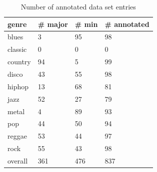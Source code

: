 \documentclass{article}
\begin{document}
\begin{table}
    \begin{center}
        \begin{tabular}{|l|l|l|l|}
        \hline
        genre & \# major & \# min & \# annotated \\
        \hline
        blues 	&3 	    &95     &98\\
        \hline
        classic &0 	    &0 	    &0\\
        \hline
        country &94 	&5 	    &99\\
        \hline
        disco 	&43 	&55 	&98\\
        \hline
        hiphop 	&13 	&68 	&81\\
        \hline
        jazz 	&52 	&27 	&79\\
        \hline
        metal 	&4 	    &89 	&93\\
        \hline
        pop 	&44 	&50 	&94\\
        \hline
        reggae 	&53 	&44 	&97\\
        \hline
        rock 	&55 	&43 	&98\\
        \hline\hline
        overall &361    &476    &837\\
        \hline
        \end{tabular}
    \end{center}
   
	\caption{Number of annotated data set entries}
	\label{tab:NumberOfAnnotatedDataSetEntries}
\end{table}
\end{document}
